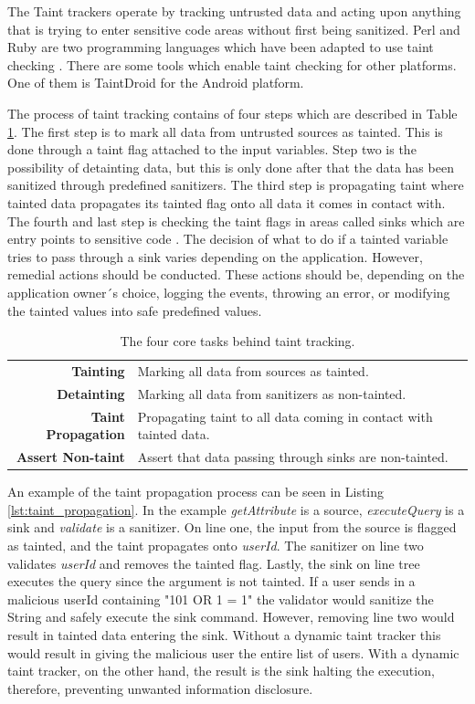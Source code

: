 The Taint trackers operate by tracking untrusted data and acting upon anything that is trying to enter sensitive code areas without first being sanitized. Perl and Ruby are two programming languages which have been adapted to use taint checking \parencite{perl, ruby}. There are some tools which enable taint checking for other platforms. One of them is TaintDroid \parencite{Ma2010} for the Android platform.

The process of taint tracking contains of four steps which are described in Table \ref{table:taintTracking}. The first step is to mark all data from untrusted sources as tainted. This is done through a taint flag attached to the input variables. Step two is the possibility of detainting data, but this is only done after that the data has been sanitized through predefined sanitizers. The third step is propagating taint where tainted data propagates its tainted flag onto all data it comes in contact with. The fourth and last step is checking the taint flags in areas called sinks which are entry points to sensitive code \parencite{Pan2015, Venkataramani2008}. The decision of what to do if a tainted variable tries to pass through a sink varies depending on the application. However, remedial actions should be conducted. These actions should be, depending on the application owner´s choice, logging the events, throwing an error, or modifying the tainted values into safe predefined values. 

\begin{table}[H]
  \centering
  \caption{The four core tasks behind taint tracking.}
  \label{table:taintTracking}
  \begin{tabular}{rp{8.5cm}}
    \textbf{Tainting}           & Marking all data from sources as tainted.                          \\
    \textbf{Detainting}         & Marking all data from sanitizers as non-tainted.                   \\
    \textbf{Taint Propagation}     & Propagating taint to all data coming in contact with tainted data. \\
    \textbf{Assert Non-taint} & Assert that data passing through sinks are non-tainted.           
  \end{tabular}
\end{table}

An example of the taint propagation process can be seen in Listing \ref{lst:taint_propagation}. In the example \textit{getAttribute} is a source, \textit{executeQuery} is a sink and \textit{validate} is a sanitizer. On line one, the input from the source is flagged as tainted, and the taint propagates onto \textit{userId}. The sanitizer on line two validates \textit{userId} and removes the tainted flag. Lastly, the sink on line tree executes the query since the argument is not tainted. If a user sends in a malicious userId containing "101 OR 1 = 1" the validator would sanitize the String and safely execute the sink command. However, removing line two would result in tainted data entering the sink. Without a dynamic taint tracker this would result in giving the malicious user the entire list of users. With a dynamic taint tracker, on the other hand, the result is the sink halting the execution, therefore, preventing unwanted information disclosure.

